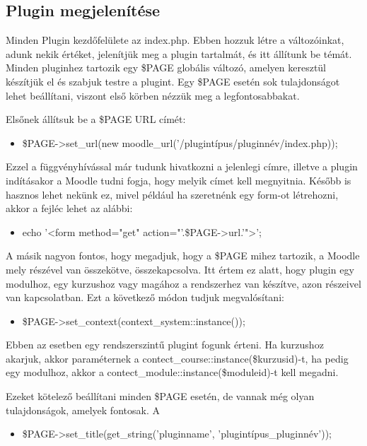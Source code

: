 \subsection{Plugin megjelenítése}

Minden Plugin kezdőfelülete az index.php. Ebben hozzuk létre a változóinkat, adunk nekik értéket, jelenítjük meg a plugin tartalmát, és itt állítunk be témát. Minden pluginhez tartozik egy \$PAGE globális változó, amelyen keresztül készítjük el és szabjuk testre a plugint. Egy \$PAGE esetén sok tulajdonságot lehet beállítani, viszont első körben nézzük meg a legfontosabbakat. \par
Elsőnek állítsuk be a \$PAGE URL címét: 
\begin{itemize}
    \item[] \$PAGE->set\_url(new moodle\_url('/plugintípus/pluginnév/index.php));
\end{itemize}

Ezzel a függvényhívással már tudunk hivatkozni a jelenlegi címre, illetve a plugin indításakor a Moodle tudni fogja, hogy melyik címet kell megnyitnia. Később is hasznos lehet nekünk ez, mivel például ha szeretnénk egy form-ot létrehozni, akkor a fejléc lehet az alábbi:
\begin{itemize}
    \item[] echo '<form method="get" action="'.\$PAGE->url.'">';
\end{itemize}

A másik nagyon fontos, hogy megadjuk, hogy a \$PAGE mihez tartozik, a Moodle mely részével van összekötve, összekapcsolva. Itt értem ez alatt, hogy plugin egy modulhoz, egy kurzushoz vagy magához a rendszerhez van készítve, azon részeivel van kapcsolatban. Ezt a következő módon tudjuk megvalósítani:

\begin{itemize}
    \item[] \$PAGE->set\_context(context\_system::instance());
\end{itemize}

Ebben az esetben egy rendszerszintű plugint fogunk érteni. Ha kurzushoz akarjuk, akkor paraméternek a contect\_course::instance(\$kurzusid)-t, ha pedig egy modulhoz, akkor a contect\_module::instance(\$moduleid)-t kell megadni. \par

Ezeket kötelező beállítani minden \$PAGE esetén, de vannak még olyan tulajdonságok, amelyek fontosak. A
\begin{itemize}
    \item[] \$PAGE->set\_title(get\_string('pluginname', 'plugintípus\_pluginnév'));
\end{itemize}

